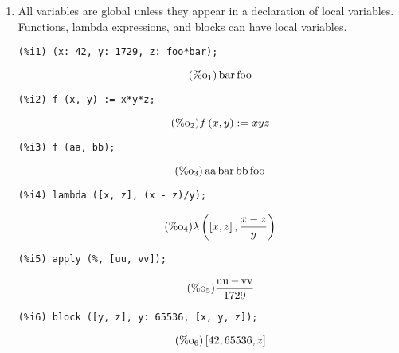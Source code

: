 \documentclass[12pt,leqno]{article}
\begin{document}
\begin{enumerate}

\item All variables are global unless they appear in a declaration of local variables.
Functions, lambda expressions, and blocks can have local variables.

\begin{verbatim}
(%i1) (x: 42, y: 1729, z: foo*bar);
\end{verbatim}
\begin{equation}
\tag{$\mathop{\mathrm{\%o}_{1}}$}\mathop{\mathrm{bar}} \mathop{\mathrm{foo}}
\label{eq:doc-group1-code34-1-1}
\end{equation}
\begin{verbatim}
(%i2) f (x, y) := x*y*z;
\end{verbatim}
\begin{equation}
\tag{$\mathop{\mathrm{\%o}_{2}}$}f\left(x, y\right) := x y z
\label{eq:doc-group1-code34-2-1}
\end{equation}
\begin{verbatim}
(%i3) f (aa, bb);
\end{verbatim}
\begin{equation}
\tag{$\mathop{\mathrm{\%o}_{3}}$}\mathop{\mathrm{aa}} \mathop{\mathrm{bar}} \mathop{\mathrm{bb}} \mathop{\mathrm{foo}}
\label{eq:doc-group1-code34-3-1}
\end{equation}
\begin{verbatim}
(%i4) lambda ([x, z], (x - z)/y);
\end{verbatim}
\begin{equation}
\tag{$\mathop{\mathrm{\%o}_{4}}$}\lambda\left(\left[x, z\right], \frac{x-z}{y}\right)
\label{eq:doc-group1-code34-4-1}
\end{equation}
\begin{verbatim}
(%i5) apply (%, [uu, vv]);
\end{verbatim}
\begin{equation}
\tag{$\mathop{\mathrm{\%o}_{5}}$}\frac{\mathop{\mathrm{uu}}-\mathop{\mathrm{vv}}}{1729}
\label{eq:doc-group1-code34-5-1}
\end{equation}
\begin{verbatim}
(%i6) block ([y, z], y: 65536, [x, y, z]);
\end{verbatim}
\begin{equation}
\tag{$\mathop{\mathrm{\%o}_{6}}$}\left[42, 65536, z\right]
\label{eq:doc-group1-code34-6-1}
\end{equation}



\end{enumerate}
\end{document}
